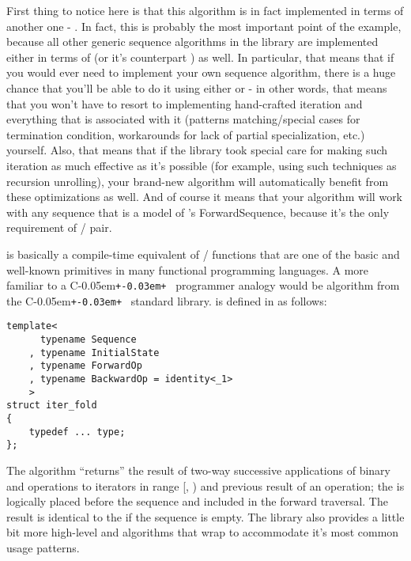\documentclass{netobjectdays}
\newcommand{\Cpp}{C\kern-0.05em\texttt{+\kern-0.03em+}%
}
\begin{document}
First thing to notice here is that this algorithm is in fact 
implemented in terms of another one - . 
In fact, this is probably the most important point of the 
example, because all other generic sequence algorithms in 
the library are implemented either in terms of 
(or it's counterpart ) as well. In particular, 
that means that if you would ever need to implement your own 
sequence algorithm, there is a huge chance that you'll be able 
to do it using either  or  - 
in other words, that means that you won't have to resort to 
implementing hand-crafted iteration and everything that is 
associated with it (patterns matching/special cases for 
termination condition, workarounds for lack of partial 
specialization, etc.) yourself. Also, that means that if the 
library took special care for making such iteration as much 
effective as it's possible (for example, using such techniques 
as recursion unrolling), your brand-new algorithm will 
automatically benefit from these optimizations as well. And of 
course it means that your algorithm will work with any 
sequence that is a model of 's 
ForwardSequence, because it's the only requirement of 
/ pair.

 is basically a compile-time equivalent of 
/ functions that are one of the basic 
and well-known primitives in many functional programming 
languages. A more familiar to a \Cpp\ programmer analogy would 
be  algorithm from the \Cpp\ standard 
library.  is defined in  
as follows:

{\footnotesize
\begin{verbatim}
template<
      typename Sequence
    , typename InitialState
    , typename ForwardOp
    , typename BackwardOp = identity<_1>
    >
struct iter_fold
{
    typedef ... type;
};
\end{verbatim}
}


The algorithm ``returns'' the result of two-way successive 
applications of binary  and 
operations to iterators in range 
[, ) 
and previous result of an operation; 
the  is logically placed before the 
sequence and included in the forward traversal. The result 
 is identical to the  if the 
sequence is empty. 
The library also provides a little bit more high-level 
 and  algorithms that wrap 
 to accommodate it's most common usage 
patterns.
\end{document}
